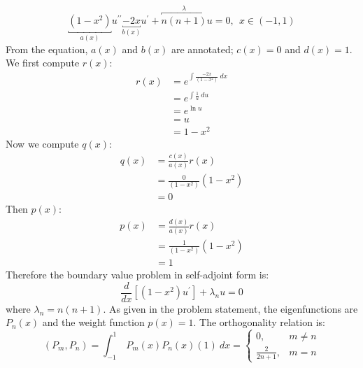 \begin{equation*}
\underbracket{\left(1-x^2\right)}_{a(x)}u^{\prime \prime} \underbracket{- 2x}_{b(x)}u^{\prime}+\overbracket{n(n+1)}^{\lambda}u = 0, \ \ x\in(-1,1)
\end{equation*}
From the equation, $a(x)$ and $b(x)$ are annotated; $c(x) = 0$ and $d(x) = 1$.  We first compute $r(x)$:
\begin{align*}
r(x) &= e^{\int \frac{-2x}{\left(1-x^2\right)} \ dx} \\
&= e^{\int \frac{1}{u} \ du }\\
&= e^{\ln{u}} \\
&= u \\
&= 1-x^2
\end{align*}
Now we compute $q(x):$
\begin{align*}
q(x) &= \frac{c(x)}{a(x)}r(x) \\
&= \frac{0}{\left(1-x^2\right)}\left(1-x^2\right) \\
&= 0
\end{align*}
Then $p(x)$:
\begin{align*}
p(x) &= \frac{d(x)}{a(x)} r(x) \\
&= \frac{1}{\left(1-x^2\right)}\left(1-x^2\right) \\
&= 1
\end{align*}
Therefore the boundary value problem in self-adjoint form is:
\begin{equation}
\frac{d}{dx}\left[\left(1-x^2\right)u^{\prime} \right]+\lambda_n u = 0
\end{equation}
where $\lambda_n = n(n+1)$.
As given in the problem statement, the eigenfunctions are $P_n(x)$ and the weight function $p(x) = 1$.  The orthogonality relation is:
\begin{equation*}
\left(P_m,P_n\right) = \int_{-1}^{1} \ P_m(x) P_n(x) (1) \ dx = 
\begin{cases}
0, & m \ne n \\
\frac{2}{2n+1}, & m = n
\end{cases}
\end{equation*}

